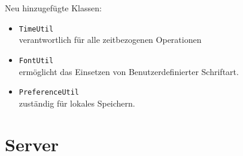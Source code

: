 \documentclass[a4paper]{scrreprt}
\begin{document}
                    Neu hinzugefügte Klassen:
                    \begin{itemize}
                        \item \texttt{TimeUtil} \\ verantwortlich für alle zeitbezogenen Operationen
                        \item \texttt{FontUtil} \\ ermöglicht das Einsetzen von Benutzerdefinierter Schriftart. 
                        \item \texttt{PreferenceUtil} \\ zuständig für lokales Speichern.
                    \end{itemize}

        \newpage
        \section{Server}
\end{document}
